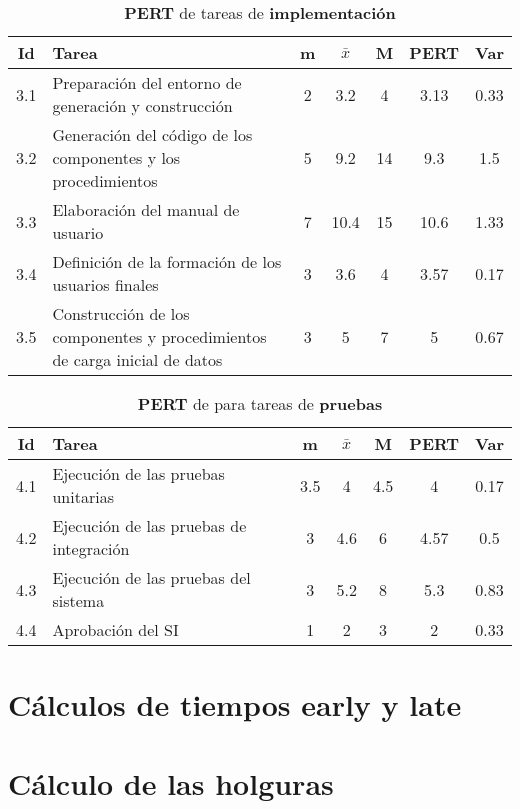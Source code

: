 \documentclass[11pt,a4paper,spanish,twoside]{report}
\begin{document}
\begin{table}[!h]
\centering
  \begin{tabular}{|c||p{5.3cm}||c|c|c||c|c|}
    \hline
    \textbf{Id} & \textbf{Tarea} & \textbf{m} & 
    \textbf{$\bar{x}$} &\textbf{M} & \textbf{PERT} & \textbf{Var}\\
    \hline \hline
    3.1 & Preparación del entorno de generación y construcción & 2 & 3.2  & 4
    & 3.13 & 0.33\\
    \hline
    3.2 & Generación del código de los componentes y los procedimientos & 5 &
    9.2 & 14 & 9.3 & 1.5\\
    \hline
    3.3 & Elaboración del manual de usuario & 7 & 10.4 & 15 & 10.6 & 1.33\\
    \hline
    3.4 & Definición de la formación de los usuarios finales & 3 & 3.6 & 4
    &3.57 & 0.17\\
    \hline
    3.5 & Construcción de los componentes y procedimientos de carga inicial
    de datos & 3 & 5 & 7 & 5 & 0.67\\
    \hline
  \end{tabular}
  \caption{\textbf{PERT} de tareas de \textbf{implementación}}
  \label{Tab:tareas3}
\end{table}

\begin{table}[!h]
\centering
  \begin{tabular}{|c||p{5.3cm}||c|c|c||c|c|}
    \hline
    \textbf{Id} & \textbf{Tarea} & \textbf{m} & 
    \textbf{$\bar{x}$} &\textbf{M} & \textbf{PERT} & \textbf{Var}\\
    \hline \hline
    4.1 & Ejecución de las pruebas unitarias & 3.5 & 4 & 4.5 & 4 & 0.17\\
    \hline
    4.2 & Ejecución de las pruebas de integración & 3 & 4.6 & 6 & 4.57 & 0.5\\
    \hline
    4.3 & Ejecución de las pruebas del sistema & 3 & 5.2 & 8 & 5.3 & 0.83\\
    \hline
    4.4 & Aprobación del SI & 1 & 2 & 3 & 2 & 0.33\\
    \hline
  \end{tabular}
  \caption{\textbf{PERT} de para tareas de \textbf{pruebas}}
  \label{Tab:tareas4}
\end{table}

\section{Cálculos de tiempos early y late}
\section{Cálculo de las holguras}
\end{document}
